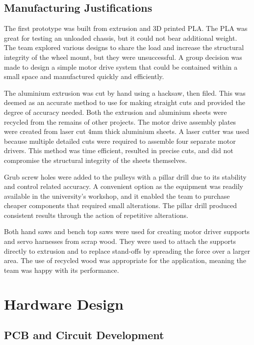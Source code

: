 \documentclass [12pt]{article}
\begin{document}
\subsection{Manufacturing Justifications}

The first prototype was built from extrusion and 3D printed PLA. The PLA was great for testing an unloaded chassis, but it could not bear additional weight. The team explored various designs to share the load and increase the structural integrity of the wheel mount, but they were unsuccessful. A group decision was made to design a simple motor drive system that could be contained within a small space and manufactured quickly and efficiently.

The aluminium extrusion was cut by hand using a hacksaw, then filed. This was deemed as an accurate method to use for making straight cuts and provided the degree of accuracy needed. Both the extrusion and aluminium sheets were recycled from the remains of other projects. The motor drive assembly plates were created from laser cut 4mm thick aluminium sheets. A laser cutter was used because multiple detailed cuts were required to assemble four separate motor drivers. This method was time efficient, resulted in precise cuts, and did not compromise the structural integrity of the sheets themselves.

Grub screw holes were added to the pulleys with a pillar drill due to its stability and control related accuracy. A convenient option as the equipment was readily available in the university’s workshop, and it enabled the team to purchase cheaper components that required small alterations. The pillar drill produced consistent results through the action of repetitive alterations.

Both hand saws and bench top saws were used for creating motor driver supports and servo harnesses from scrap wood. They were used to attach the supports directly to extrusion and to replace stand-offs by spreading the force over a larger area. The use of recycled wood was appropriate for the application, meaning the team was happy with its performance.

\newpage
\section{Hardware Design}

\subsection{PCB and Circuit Development}
\end{document}
